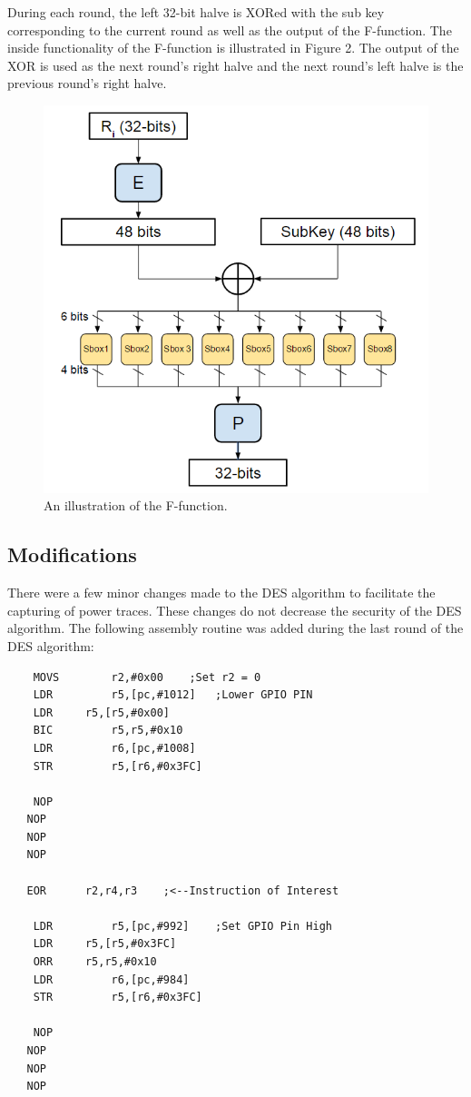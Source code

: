 \documentclass[letterpaper, 10 pt, conference]{ieeeconf}  %
\begin{document}
During each round, the left 32-bit halve is XORed with the sub key corresponding to the current round as well as the output of the F-function.  The inside functionality of the F-function is illustrated in Figure 2. The output of the XOR is used as the next round's right halve and the next round's left halve is the previous round's right halve.

\begin{figure}[thpb]
	\centering
	\includegraphics[scale=.50]{Ffunction}
    \caption{An illustration of the F-function.}
\end{figure}

\subsection{Modifications}

There were a few minor changes made to the DES algorithm to facilitate the capturing of power traces.  These changes do not decrease the security of the DES algorithm.  The following assembly routine was added during the last round of the DES algorithm: 

\begin{lstlisting}
	MOVS		r2,#0x00	;Set r2 = 0 
	LDR     	r5,[pc,#1012]	;Lower GPIO PIN  
	LDR		r5,[r5,#0x00]
	BIC     	r5,r5,#0x10
	LDR     	r6,[pc,#1008]  
	STR     	r5,[r6,#0x3FC]
 
 	NOP           
   NOP
   NOP           
   NOP                             
    
   EOR      r2,r4,r3	;<--Instruction of Interest
 
	LDR 		r5,[pc,#992]	;Set GPIO Pin High  
	LDR    	r5,[r5,#0x3FC]
	ORR    	r5,r5,#0x10
	LDR     	r6,[pc,#984]  
	STR     	r5,[r6,#0x3FC]
	
	NOP           
   NOP
   NOP           
   NOP
	
\end{lstlisting}
\end{document}
